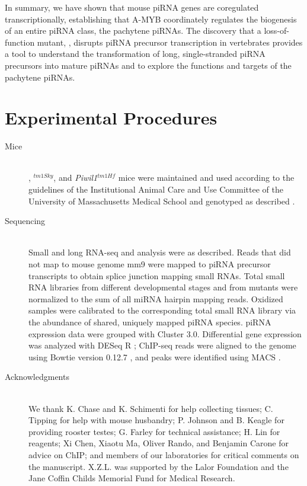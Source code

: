  In summary, we have shown that mouse piRNA genes are coregulated transcriptionally, establishing that A-MYB coordinately regulates the biogenesis of an entire piRNA class, the pachytene piRNAs. The discovery that a loss-of-function \amyb{} mutant, \mybrepro{}, disrupts piRNA precursor transcription in vertebrates provides a tool to understand the transformation of long, single-stranded piRNA precursors into mature piRNAs and to explore the functions and targets of the pachytene piRNAs.

\section{Experimental Procedures}
  \label{MolCel:sec:Experimental Procedures}

  \begin{description}
    \item[Mice] \hfill \\
    \mybrepro{}, \textit{\spo{}}$^{tm1Sky}$, and \textit{Piwil1}$^{tm1Hf}$ mice were maintained and used according to the guidelines of the Institutional Animal Care and Use Committee of the University of Massachusetts Medical School and genotyped as described \citep{Baudat2000c, Deng2002c, Bolcun-Filas2011}.

    \item[Sequencing] \hfill \\
    Small \citep{Ghildiyal2008, Seitz2008} and long RNA-seq \citep{Zhang2012a} and analysis \citep{Li2009a} were as described. Reads that did not map to mouse genome mm9 were mapped to piRNA precursor transcripts to obtain splice junction mapping small RNAs. Total small RNA libraries from different developmental stages and from mutants were normalized to the sum of all miRNA hairpin mapping reads. Oxidized samples were calibrated to the corresponding total small RNA library via the abundance of shared, uniquely mapped piRNA species. piRNA expression data were grouped with Cluster 3.0. Differential gene expression was analyzed with DESeq R \citep{Anders2010a}; ChIP-seq reads were aligned to the genome using Bowtie version 0.12.7 \citep{Langmead2009}, and peaks were identified using MACS \citep{Zhang2008}.

    \item[Acknowledgments] \hfill \\
    We thank K. Chase and K. Schimenti for help collecting tissues; C. Tipping for help with mouse husbandry; P. Johnson and B. Keagle for providing rooster testes; G. Farley for technical assistance; H. Lin for reagents; Xi Chen, Xiaotu Ma, Oliver Rando, and Benjamin Carone for advice on ChIP; and members of our laboratories for critical comments on the manuscript. X.Z.L. was supported by the Lalor Foundation and the Jane Coffin Childs Memorial Fund for Medical Research.


\end{description}
